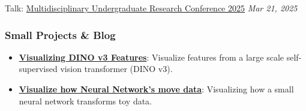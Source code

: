 \documentclass[
  11pt,
]{article}
\begin{document}
Talk:
\href{https://students.ubc.ca/career/events-workshops/multidisciplinary-undergraduate-research-conference/}{Multidisciplinary
Undergraduate Research Conference 2025} \textbar{} \emph{Mar 21, 2025}

\subsubsection{Small Projects \& Blog}\label{small-projects-blog}

\begin{itemize}
\item
  \textbf{\href{https://yashm8.github.io/dino3.html}{Visualizing DINO v3
  Features}}: Visualize features from a large scale self-supervised
  vision transformer (DINO v3).
\item
  \textbf{\href{https://yashm8.github.io/neural-vis.html}{Visualize how
  Neural Network's move data}}: Visualizing how a small neural network
  transforms toy data.
\end{itemize}
\end{document}
